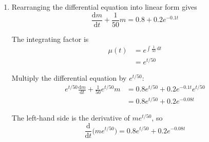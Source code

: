 \documentclass[leqno]{article}
\begin{document}
\begin{enumerate}[
  label=\textbf{\arabic*.},
  leftmargin=*,
  topsep=0pt,
  partopsep=0pt,
  parsep=0pt
]
\begin{djsSolution}
\begin{enumerate}[label=\textbf{(\alph*)}]
\begin{enumerate}[label=(\roman*)]
    So the net rate of change of volume is
    \[
    0.2+0.1-0.3=0\,\mathrm{L\,min}^{-1}
    \]

    Hence the volume stays constant at its initial value of $15$ litres:
    \[
    V(t)=15
    \]

    So the volume of liquid in the tank at time $t$ is $15$ litres.

    \item The rate at which dye enters through the first pipe is
    \[
    0.2\bigl(4+e^{-0.1t}\bigr)\,\mathrm{mg\,min}^{-1}
    \]

    so
    \[
    \text{rate in}=0.8+0.2e^{-0.1t}
    \]

    The second pipe contains pure water, so it contributes no dye.

    Since the tank is well mixed and has volume $15\,\mathrm{L}$, the concentration of dye in the tank is
    \[
    \frac{m}{15}\,\mathrm{mg\,L}^{-1}
    \]

    Therefore the rate at which dye leaves the tank is
    \[
    0.3\times \frac{m}{15}=\frac{0.3m}{15}=\frac{m}{50}\,\mathrm{mg\,min}^{-1}
    \]

    Hence
    \[
    \frac{\mathrm{d}m}{\mathrm{d}t}=\text{rate in}-\text{rate out}
    \]

    so
    \[
    \frac{\mathrm{d}m}{\mathrm{d}t}=0.8+0.2e^{-0.1t}-\frac{m}{50}
    \]

    as required.
  \end{enumerate}

  \item Rearranging the differential equation into linear form gives
  \[
  \frac{\mathrm{d}m}{\mathrm{d}t}+\frac{1}{50}m=0.8+0.2e^{-0.1t}
  \]

  The integrating factor is
  \begin{align*}
  \mu(t)&=e^{\int \frac{1}{50}\,\mathrm{d}t}\\
  &=e^{t/50}
  \end{align*}

  Multiply the differential equation by $e^{t/50}$:
  \begin{align*}
  e^{t/50}\frac{\mathrm{d}m}{\mathrm{d}t}+\frac{1}{50}e^{t/50}m
  &=0.8e^{t/50}+0.2e^{-0.1t}e^{t/50} \\
  &=0.8e^{t/50}+0.2e^{-0.08t}
  \end{align*}

  The left-hand side is the derivative of $me^{t/50}$, so
  \[
  \frac{\mathrm{d}}{\mathrm{d}t}\bigl(me^{t/50}\bigr)=0.8e^{t/50}+0.2e^{-0.08t}
  \]


\end{enumerate}
\end{djsSolution}
\end{enumerate}
\end{document}
